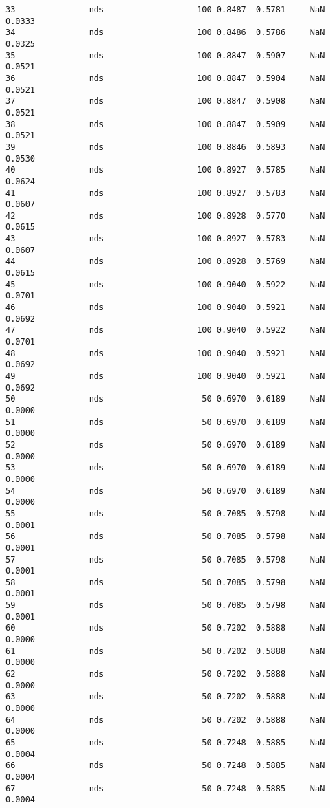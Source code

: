 \documentclass[11pt]{article}
\begin{document}
\begin{Verbatim}[commandchars=\\\{\}]
33               nds                   100 0.8487  0.5781     NaN 0.0333   
34               nds                   100 0.8486  0.5786     NaN 0.0325   
35               nds                   100 0.8847  0.5907     NaN 0.0521   
36               nds                   100 0.8847  0.5904     NaN 0.0521   
37               nds                   100 0.8847  0.5908     NaN 0.0521   
38               nds                   100 0.8847  0.5909     NaN 0.0521   
39               nds                   100 0.8846  0.5893     NaN 0.0530   
40               nds                   100 0.8927  0.5785     NaN 0.0624   
41               nds                   100 0.8927  0.5783     NaN 0.0607   
42               nds                   100 0.8928  0.5770     NaN 0.0615   
43               nds                   100 0.8927  0.5783     NaN 0.0607   
44               nds                   100 0.8928  0.5769     NaN 0.0615   
45               nds                   100 0.9040  0.5922     NaN 0.0701   
46               nds                   100 0.9040  0.5921     NaN 0.0692   
47               nds                   100 0.9040  0.5922     NaN 0.0701   
48               nds                   100 0.9040  0.5921     NaN 0.0692   
49               nds                   100 0.9040  0.5921     NaN 0.0692   
50               nds                    50 0.6970  0.6189     NaN 0.0000   
51               nds                    50 0.6970  0.6189     NaN 0.0000   
52               nds                    50 0.6970  0.6189     NaN 0.0000   
53               nds                    50 0.6970  0.6189     NaN 0.0000   
54               nds                    50 0.6970  0.6189     NaN 0.0000   
55               nds                    50 0.7085  0.5798     NaN 0.0001   
56               nds                    50 0.7085  0.5798     NaN 0.0001   
57               nds                    50 0.7085  0.5798     NaN 0.0001   
58               nds                    50 0.7085  0.5798     NaN 0.0001   
59               nds                    50 0.7085  0.5798     NaN 0.0001   
60               nds                    50 0.7202  0.5888     NaN 0.0000   
61               nds                    50 0.7202  0.5888     NaN 0.0000   
62               nds                    50 0.7202  0.5888     NaN 0.0000   
63               nds                    50 0.7202  0.5888     NaN 0.0000   
64               nds                    50 0.7202  0.5888     NaN 0.0000   
65               nds                    50 0.7248  0.5885     NaN 0.0004   
66               nds                    50 0.7248  0.5885     NaN 0.0004   
67               nds                    50 0.7248  0.5885     NaN 0.0004   

\end{Verbatim}
\end{document}
